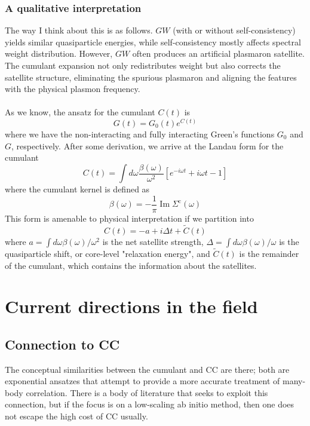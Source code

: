 \subsubsection{A qualitative interpretation}
The way I think about this is as follows. $GW$ (with or without self-consistency) yields similar quasiparticle energies, while self-consistency mostly affects spectral weight distribution. However, $GW$ often produces an artificial plasmaron satellite. The cumulant expansion not only redistributes weight but also corrects the satellite structure, eliminating the spurious plasmaron and aligning the features with the physical plasmon frequency.\\\\
As we know, the ansatz for the cumulant $C(t)$ is
\begin{equation}
    G(t) = G_0(t) e^{C(t)}
\end{equation}
where we have the non-interacting and fully interacting Green's functions $G_0$ and $G$, respectively. After some derivation, we arrive at the Landau form for the cumulant
\begin{equation}
    C(t)=\int d \omega \frac{\beta(\omega)}{\omega^2}\left[e^{-i \omega t}+i \omega t-1\right]
\end{equation}
where the cumulant kernel is defined as
\begin{equation}
    \beta(\omega)=-\frac{1}{\pi} \operatorname{Im} \Sigma^{\mathrm{c}}(\omega)
\end{equation}
This form is amenable to physical interpretation if we partition into
\begin{equation}
    C(t)=-a+i \Delta t+\tilde{C}(t)
\end{equation}
where $a=\int d \omega \beta(\omega) / \omega^2$ is the net satellite strength, $\Delta=\int d \omega \beta(\omega) / \omega$ is the quasiparticle shift, or core-level "relaxation energy", and $\tilde{C}(t)$ is the remainder of the cumulant, which contains the information about the satellites.
\section{Current directions in the field}
\subsection{Connection to CC}
The conceptual similarities between the cumulant and CC are there; both are exponential ansatzes that attempt to provide a more accurate treatment of many-body correlation. There is a body of literature that seeks to exploit this connection, but if the focus is on a low-scaling ab initio method, then one does not escape the high cost of CC usually.
